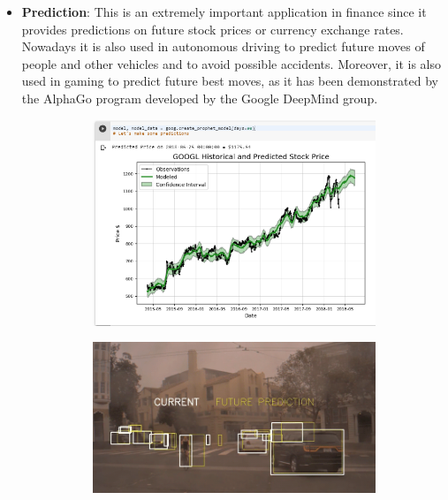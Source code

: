 \begin{itemize}
          \newpage
    \item \textbf{Prediction}: This is an extremely important
          application in finance since it provides predictions on future
          stock prices or currency exchange rates. Nowadays it is also
          used in autonomous driving to predict future moves of people
          and other vehicles and to avoid possible accidents. Moreover,
          it is also used in gaming to predict future best moves, as it
          has been demonstrated by the AlphaGo program developed by the
          Google DeepMind group.
          \vspace{5mm}

          \begin{figure}[h]
              \centering
              \begin{subfigure}{0.45\textwidth}
                  \centering
                  \includegraphics[width=\textwidth]{../img/Prediction_finance}
              \end{subfigure}
              \hfill
              \begin{subfigure}{0.45\textwidth}
                  \centering
                  \includegraphics[width=\textwidth]{../img/Autonomous_driving}
              \end{subfigure}
          \end{figure}


\end{itemize}
